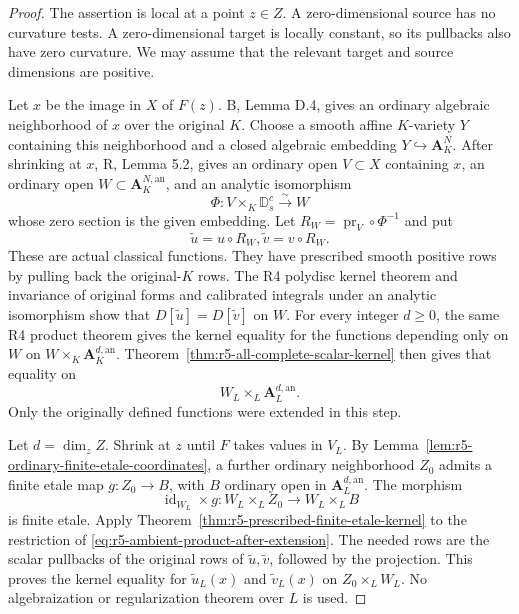 \documentclass[11pt,a4paper]{article}
\numberwithin{equation}{section}
\theoremstyle{definition}
\theoremstyle{remark}
\begin{document}
\begin{proof}
The assertion is local at a point $z\in Z$.  A zero-dimensional
source has no curvature tests.  A zero-dimensional target is
locally constant, so its pullbacks also have zero curvature.
We may assume that the relevant target and source dimensions are
positive.

Let $x$ be the image in $X$ of $F(z)$.  B, Lemma D.4, gives an
ordinary algebraic neighborhood of $x$ over the original $K$.
Choose a smooth affine $K$-variety $Y$ containing this neighborhood
and a closed algebraic embedding $Y\hookrightarrow\mathbf A_K^N$.
After shrinking at $x$, R, Lemma 5.2, gives an ordinary open
$V\subset X$ containing $x$, an ordinary open
$W\subset\mathbf A_K^{N,\mathrm{an}}$, and an analytic isomorphism
\[
        \Phi:V\times_K\mathbb D_s^c\xrightarrow{\sim}W
\]
whose zero section is the given embedding.  Let
$R_W=\operatorname{pr}_V\circ\Phi^{-1}$ and put
\[
            \widetilde u=u\circ R_W,
            \widetilde v=v\circ R_W.
\]
These are actual classical functions.  They have prescribed smooth
positive rows by pulling back the original-$K$ rows.  The R4
polydisc kernel theorem and invariance of original forms and
calibrated integrals under an analytic isomorphism show that
$D[\widetilde u]=D[\widetilde v]$ on $W$.
For every integer $d\geq0$, the same R4 product theorem gives the
kernel equality for the functions depending only on $W$ on
$W\times_K\mathbf A_K^{d,\mathrm{an}}$.
Theorem~\ref{thm:r5-all-complete-scalar-kernel} then gives that
equality on
\begin{equation}
                 W_L\times_L\mathbf A_L^{d,\mathrm{an}}.
 \label{eq:r5-ambient-product-after-extension}
\end{equation}
Only the originally defined functions were extended in this step.

Let $d=\dim_z Z$.  Shrink at $z$ until $F$ takes values in $V_L$.
By Lemma~\ref{lem:r5-ordinary-finite-etale-coordinates}, a further
ordinary neighborhood $Z_0$ admits a finite etale map
$g:Z_0\to B$, with $B$ ordinary open in
$\mathbf A_L^{d,\mathrm{an}}$.  The morphism
\[
 \operatorname{id}_{W_L}\times g:
             W_L\times_L Z_0\longrightarrow W_L\times_L B
\]
is finite etale.  Apply
Theorem~\ref{thm:r5-prescribed-finite-etale-kernel} to the
restriction of \eqref{eq:r5-ambient-product-after-extension}.
The needed rows are the scalar pullbacks of the original rows of
$\widetilde u,\widetilde v$, followed by the projection.
This proves the kernel equality for $\widetilde u_L(x)$ and
$\widetilde v_L(x)$ on $Z_0\times_L W_L$.
No algebraization or regularization theorem over $L$ is used.


\end{proof}
\end{document}
